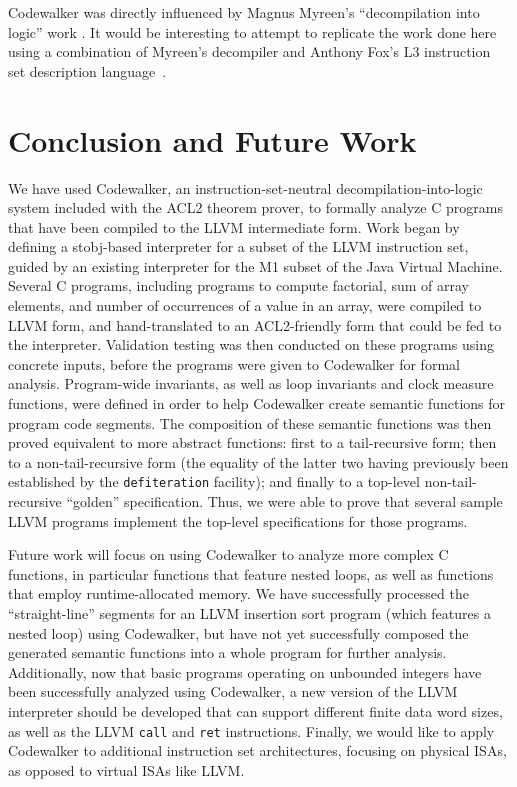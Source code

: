 \documentclass{eptcs}
\begin{document}
Codewalker was directly influenced by Magnus Myreen's
``decompilation into logic'' work \cite{decomp}.  It would be 
interesting to attempt to replicate the work done here using 
a combination of Myreen's decompiler and Anthony Fox's L3 
instruction set description language~\cite{L3}.  

\section{Conclusion and Future Work}

We have used Codewalker, an instruction-set-neutral
decompilation-into-logic system included with the ACL2 
theorem prover, to formally analyze C programs that have been compiled 
to the LLVM intermediate form.  Work began by defining a 
stobj-based interpreter for a subset of the LLVM instruction set, 
guided by an existing interpreter for the M1 subset of the Java 
Virtual Machine.  Several C programs, including programs to compute 
factorial, sum of array elements, and number of occurrences of a 
value in an array, were compiled to LLVM form, and hand-translated 
to an ACL2-friendly form that could be fed to the interpreter.  
Validation testing was then conducted on these programs using 
concrete inputs, before the programs were given to Codewalker for  
formal analysis.  Program-wide invariants, as well as loop invariants 
and clock measure functions, were 
defined in order to help Codewalker create semantic functions for 
program code segments.  The composition of these semantic functions 
was then proved equivalent to more abstract functions: first to a tail-recursive
form; then to a non-tail-recursive form (the equality of the 
latter two having previously been established by the
\texttt{defiteration} facility); and finally to a top-level 
non-tail-recursive ``golden'' specification.  Thus, we were 
able to prove that several sample LLVM programs implement the top-level 
specifications for those programs.

Future work will focus on using Codewalker to analyze more 
complex C functions, in particular functions that feature nested 
loops, as well as functions that employ runtime-allocated memory.  
We have successfully processed the ``straight-line'' segments for 
an LLVM insertion sort program (which features a nested loop) 
using Codewalker, but have not yet successfully 
composed the generated semantic functions into a whole 
program for further analysis.
Additionally, now that basic programs operating on unbounded integers 
have been successfully analyzed using Codewalker, a new version of 
the LLVM interpreter should be developed that can support different 
finite data word sizes, as well as the LLVM \texttt{call} and 
\texttt{ret} instructions.  Finally, we would like to apply Codewalker
to additional instruction set architectures, focusing on physical
ISAs, as opposed to virtual ISAs like LLVM.
\end{document}

